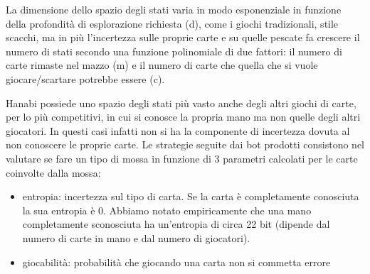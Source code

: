 \documentclass{article}
\begin{document}
\begin{flushleft}
La dimensione dello spazio degli stati varia in modo esponenziale in funzione della profondità di esplorazione richiesta (d), come i giochi tradizionali, stile scacchi, ma in più l'incertezza sulle proprie carte e su quelle pescate fa crescere il numero di stati secondo una funzione polinomiale di due fattori: il numero di carte rimaste nel mazzo (m) e il numero di carte che quella che si vuole giocare/scartare potrebbe essere (c).\newline
\newline

Hanabi possiede uno spazio degli stati più vasto anche degli altri giochi di carte, per lo più competitivi, in cui si conosce la propria mano ma non quelle degli altri giocatori. In questi casi infatti non si ha la componente di incertezza dovuta al non conoscere le proprie carte.
\newline
\newline
Le strategie seguite dai bot prodotti consistono nel valutare se fare un tipo di mossa in funzione di 3 parametri calcolati per le carte coinvolte dalla mossa:
\begin{itemize}
    \item entropia: incertezza sul tipo di carta. Se la carta è completamente conosciuta la sua entropia è 0. Abbiamo notato empiricamente che una mano completamente sconosciuta ha un'entropia di circa 22 bit (dipende dal numero di carte in mano e dal numero di giocatori).
    
    \item giocabilità: probabilità che giocando una carta non si commetta errore 
    

\end{itemize}
\end{flushleft}
\end{document}
